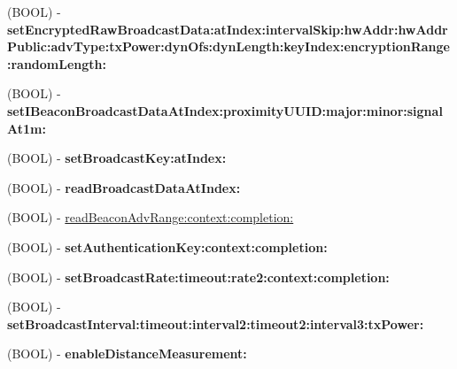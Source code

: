 \begin{DoxyCompactItemize}
\item 
\hypertarget{interface_le_snf_device_ab9dd353cec24c089989a63302ce80022}{}(B\+O\+O\+L) -\/ {\bfseries set\+Encrypted\+Raw\+Broadcast\+Data\+:at\+Index\+:interval\+Skip\+:hw\+Addr\+:hw\+Addr\+Public\+:adv\+Type\+:tx\+Power\+:dyn\+Ofs\+:dyn\+Length\+:key\+Index\+:encryption\+Range\+:random\+Length\+:}\label{interface_le_snf_device_ab9dd353cec24c089989a63302ce80022}

\item 
\hypertarget{interface_le_snf_device_a762f16585692d51dcd0ea5539806f86e}{}(B\+O\+O\+L) -\/ {\bfseries set\+I\+Beacon\+Broadcast\+Data\+At\+Index\+:proximity\+U\+U\+I\+D\+:major\+:minor\+:signal\+At1m\+:}\label{interface_le_snf_device_a762f16585692d51dcd0ea5539806f86e}

\item 
\hypertarget{interface_le_snf_device_a9f03c68b1339d2f8c65ba6848b62b582}{}(B\+O\+O\+L) -\/ {\bfseries set\+Broadcast\+Key\+:at\+Index\+:}\label{interface_le_snf_device_a9f03c68b1339d2f8c65ba6848b62b582}

\item 
\hypertarget{interface_le_snf_device_a5452551e9c9d2609aebc8bf1026031b0}{}(B\+O\+O\+L) -\/ {\bfseries read\+Broadcast\+Data\+At\+Index\+:}\label{interface_le_snf_device_a5452551e9c9d2609aebc8bf1026031b0}

\item 
(B\+O\+O\+L) -\/ \hyperlink{interface_le_snf_device_adaca216df5b86a27a553777401ef938b}{read\+Beacon\+Adv\+Range\+:context\+:completion\+:}
\item 
\hypertarget{interface_le_snf_device_a528e6dafc2f6603e8cf0c6d6ca342361}{}(B\+O\+O\+L) -\/ {\bfseries set\+Authentication\+Key\+:context\+:completion\+:}\label{interface_le_snf_device_a528e6dafc2f6603e8cf0c6d6ca342361}

\item 
\hypertarget{interface_le_snf_device_a36f8cdc79d73970df72b564f3aeccae7}{}(B\+O\+O\+L) -\/ {\bfseries set\+Broadcast\+Rate\+:timeout\+:rate2\+:context\+:completion\+:}\label{interface_le_snf_device_a36f8cdc79d73970df72b564f3aeccae7}

\item 
\hypertarget{interface_le_snf_device_a8674f3f7cf89af780f889f3cb28fc262}{}(B\+O\+O\+L) -\/ {\bfseries set\+Broadcast\+Interval\+:timeout\+:interval2\+:timeout2\+:interval3\+:tx\+Power\+:}\label{interface_le_snf_device_a8674f3f7cf89af780f889f3cb28fc262}

\item 
\hypertarget{interface_le_snf_device_a8ed4c60fb45317a501cbbfc228c6f445}{}(B\+O\+O\+L) -\/ {\bfseries enable\+Distance\+Measurement\+:}\label{interface_le_snf_device_a8ed4c60fb45317a501cbbfc228c6f445}


\end{DoxyCompactItemize}
